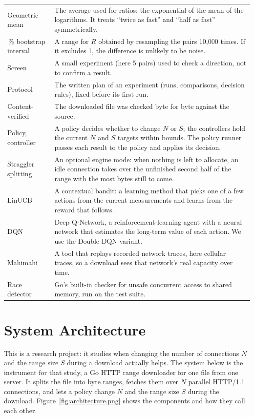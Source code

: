 \documentclass[11pt,a4paper]{report}
\begin{document}
\begin{longtable}{@{}>{\raggedright\arraybackslash}p{3.6cm}>{\raggedright\arraybackslash}p{11.6cm}@{}}
Geometric mean & The average used for ratios: the exponential of the mean of the logarithms. It treats ``twice as fast'' and ``half as fast'' symmetrically.\\
95\,\% bootstrap interval & A range for $R$ obtained by resampling the pairs 10{,}000 times. If it excludes 1, the difference is unlikely to be noise.\\
Screen & A small experiment (here 5 pairs) used to check a direction, not to confirm a result.\\
Protocol & The written plan of an experiment (runs, comparisons, decision rules), fixed before its first run.\\
Content-verified & The downloaded file was checked byte for byte against the source.\\
Policy, controller & A policy decides whether to change $N$ or $S$; the controllers hold the current $N$ and $S$ targets within bounds. The policy runner passes each result to the policy and applies its decision.\\
Straggler splitting & An optional engine mode: when nothing is left to allocate, an idle connection takes over the unfinished second half of the range with the most bytes still to come.\\
LinUCB & A contextual bandit: a learning method that picks one of a few actions from the current measurements and learns from the reward that follows.\\
DQN & Deep Q-Network, a reinforcement-learning agent with a neural network that estimates the long-term value of each action. We use the Double DQN variant.\\
Mahimahi & A tool that replays recorded network traces, here cellular traces, so a download sees that network's real capacity over time.\\
Race detector & Go's built-in checker for unsafe concurrent access to shared memory, run on the test suite.\\
\bottomrule
\end{longtable}
\endgroup

\chapter{System Architecture}
This is a research project: it studies when changing the number of connections $N$ and the range size $S$ during a download actually helps. The system below is the instrument for that study, a Go HTTP range downloader for one file from one server. It splits the file into byte ranges, fetches them over $N$ parallel HTTP/1.1 connections, and lets a policy change $N$ and the range size $S$ during the download. Figure~\ref{fig:architecture.png} shows the components and how they call each other.
\end{document}

